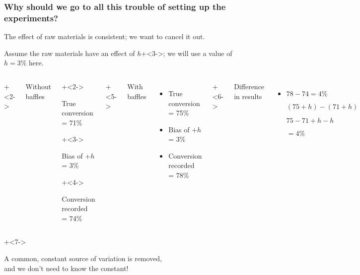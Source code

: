 \begin{frame}\frametitle{Why should we go to all this trouble of setting up the experiments?}
	
	The effect of raw materials is consistent; we want to cancel it out.
	
	\vspace{24pt}
	Assume the raw materials have an effect of $h$\onslide+<3->{; we will use a value of $h=3\%$ here.}
	
	\vspace{24pt}
	\begin{columns}[T]
			\onslide+<2->{
			\centerline{{\color{myOrange}Without baffles} }
			}
			\vspace{12pt}
			\begin{itemize}
				\setcounter{enumi}{1}
			\onslide+<2->{
				\item	True conversion = 71\%
			}
			\onslide+<3->{
				\item	Bias of $+h$ = 3\%
			}
			\onslide+<4->{	
				\item	Conversion recorded = 74\%
			}
			\end{itemize}
		
		
		\column{0.4\textwidth}
		\onslide+<5->{	
			\centerline{{\color{myOrange}With baffles}}
			\vspace{12pt}
			\begin{itemize}
				\setcounter{enumi}{1}
				\item	True conversion = 75\%
				\item	Bias of $+h$ = 3\%
				\item	Conversion recorded = 78\%
			\end{itemize}
		}

		\onslide+<6->{
			\centerline{{\color{myOrange}Difference in results}}
			
			
			
			\vspace{46pt}
			\begin{itemize}
				\item	$78 - 74 = 4\%$
				
						$(75+h)- (71+h)$
						
						$75 - 71 +h- h$
						
						$ = 4\%$
			\end{itemize}
		}
	\end{columns}
	
	\onslide+<7->{
		\vspace{6pt}
		
		{\color{myGreen}A common, constant source of variation is removed, \\
		and we don't need to know the constant!}
	}
\end{frame}

